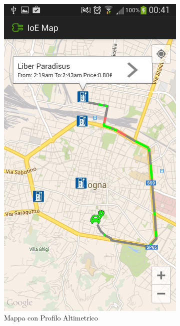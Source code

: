 \begin{figure}
	\centering
	\begin{subfigure}{0.45\textwidth}
		\includegraphics[width=\textwidth]{assets/mobile-app-map.png}
		\caption{Mappa con Profilo Altimetrico}
		\label{fig:map-altimetry}
	\end{subfigure}
	\begin{subfigure}{0.45\textwidth}

\end{subfigure}
\end{figure}
